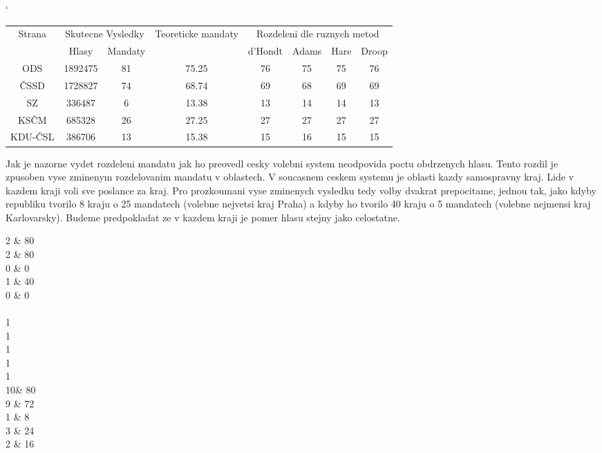 \documentclass[12pt,a4paper]{report}
\begin{document}
\begin{center}
\catcode`
\begin{tabular}{|c|c|c|c|c|c|c|c|}
\hline
\multirow{2}{*}{Strana}  & \multicolumn{2}{|c|}{Skutecne Vysledky} & \multirow{2}{*}{Teoreticke mandaty} & \multicolumn{4}{|c|}{Rozdeleni dle ruznych metod} \\ \cline{2-3} \cline{5-8}
& Hlasy & Mandaty & & d'Hondt & Adams & Hare & Droop \\  
\hline
ODS & 1892475 & 81 & 75.25 & 76 & 75 & 75 & 76 \\ 
\hline
ČSSD & 1728827 & 74 & 68.74 & 69 & 68 & 69 & 69 \\ 
\hline
SZ & 336487 & 6 & 13.38 & 13 & 14 & 14 & 13 \\ 
\hline
KSČM & 685328 & 26 & 27.25 & 27 & 27 & 27 & 27 \\ 
\hline
KDU-ČSL & 386706 & 13 & 15.38 & 15 & 16 & 15 & 15 \\ 
\hline
\end{tabular} 
\end{center}
Jak je nazorne vydet rozdeleni mandatu jak ho preovedl cesky volebni system neodpovida poctu obdrzenych hlasu.
Tento rozdil je zpusoben vyse zminenym rozdelovanim mandatu v oblastech.
V soucasnem ceskem systemu je oblasti kazdy samospravny kraj.
Lide v kazdem kraji voli sve poslance za kraj.
Pro prozkoumani vyse zminenych vysledku tedy volby dvakrat prepocitame, jednou tak, jako kdyby republiku tvorilo 8 kraju o 25 mandatech (volebne nejvetsi kraj Praha) a kdyby ho tvorilo 40 kraju o 5 mandatech (volebne nejmensi kraj Karlovarsky).
Budeme predpokladat ze v kazdem kraji je pomer hlasu stejny jako celostatne.



2 \& 80\\
2 \& 80\\
0 \& 0\\
1 \& 40\\
0 \& 0\\
\\
1\\
1\\
1\\
1\\
1\\


10\& 80 \\
9 \& 72\\
1 \& 8\\
3 \& 24\\
2 \& 16\\
\end{document}
